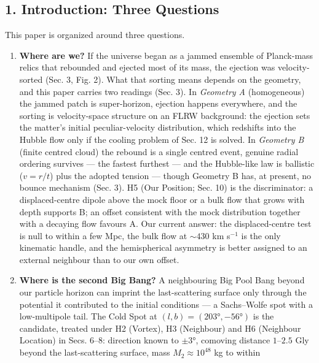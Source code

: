 \documentclass[
]{article}
\begin{document}
\hypertarget{introduction-three-questions}{%
\subsection{\texorpdfstring{\textbf{1. Introduction: Three
Questions}}{1. Introduction: Three Questions}}\label{introduction-three-questions}}

This paper is organized around three questions.

\begin{enumerate}
\def\labelenumi{\arabic{enumi}.}
\item
  \textbf{Where are we?} If the universe began as a jammed ensemble of
  Planck-mass relics that rebounded and ejected most of its mass, the
  ejection was velocity-sorted (Sec. 3, Fig. 2). What that sorting means
  depends on the geometry, and this paper carries two readings (Sec. 3).
  In \emph{Geometry A} (homogeneous) the jammed patch is super-horizon,
  ejection happens everywhere, and the sorting is velocity-space
  structure on an FLRW background: the ejection sets the matter's
  initial peculiar-velocity distribution, which redshifts into the
  Hubble flow only if the cooling problem of Sec. 12 is solved. In
  \emph{Geometry B} (finite centred cloud) the rebound is a single
  centred event, genuine radial ordering survives --- the fastest
  furthest --- and the Hubble-like law is ballistic (\(v = r/t\)) plus
  the adopted tension --- though Geometry B has, at present, no bounce
  mechanism (Sec. 3). H5 (Our Position; Sec. 10) is the discriminator: a
  displaced-centre dipole above the mock floor or a bulk flow that grows
  with depth supports B; an offset consistent with the mock distribution
  together with a decaying flow favours A. Our current answer: the
  displaced-centre test is null to within a few Mpc, the bulk flow at
  \(\sim\!430\) km s\(^{-1}\) is the only kinematic handle, and the
  hemispherical asymmetry is better assigned to an external neighbour
  than to our own offset.
\item
  \textbf{Where is the second Big Bang?} A neighbouring Big Pool Bang
  beyond our particle horizon can imprint the last-scattering surface
  only through the potential it contributed to the initial conditions
  --- a Sachs--Wolfe spot with a low-multipole tail. The Cold Spot at
  \((l,b) = (203°, -56°)\) is the candidate, treated under H2 (Vortex),
  H3 (Neighbour) and H6 (Neighbour Location) in Secs. 6--8: direction
  known to \(\pm 3°\), comoving distance \(1\)--\(2.5\) Gly beyond the
  last-scattering surface, mass \(M_2 \approx 10^{48}\) kg to within

\end{enumerate}
\end{document}
